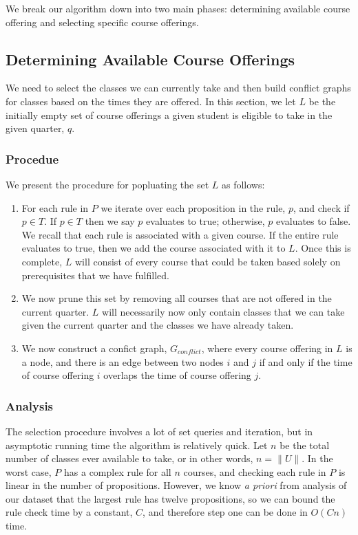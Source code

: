 \documentclass[11pt]{article} %
\begin{document}
We break our algorithm down into two main phases: determining available course offering and selecting specific course offerings.

\subsection{Determining Available Course Offerings}
We need to select the classes we can currently take and then build conflict graphs for classes based on the times they are offered. In this section, we let $L$ be the initially empty set of course offerings a given student is eligible to take in the given quarter, $q$. \\

\subsubsection{Procedue}
We present the procedure for popluating the set $L$ as follows:
\begin{enumerate}
\item For each rule in $P$ we iterate over each proposition in the rule, $p$, and check if $p \in T$. If $p \in T$ then we say $p$ evaluates to true; otherwise, $p$ evaluates to false. We recall that each rule is associated with a given course. If the entire rule evaluates to true, then we add the course associated with it to $L$. Once this is complete, $L$ will consist of every course that could be taken based solely on prerequisites that we have fulfilled.
\item We now prune this set by removing all courses that are not offered in the current quarter. $L$ will necessarily now only contain classes that we can take given the current quarter and the classes we have already taken.
\item We now construct a confict graph, $G_{conflict}$, where every course offering in $L$ is a node, and there is an edge between two nodes $i$ and $j$ if and only if the time of course offering $i$ overlaps the time of course offering $j$.
\end{enumerate}

\subsubsection{Analysis}
The selection procedure involves a lot of set queries and iteration, but in asymptotic running time the algorithm is relatively quick. Let $n$ be the total number of classes ever available to take, or in other words, $n = \|U\|$. In the worst case, $P$ has a complex rule for all $n$ courses, and checking each rule in $P$ is linear in the number of propositions. However, we know {\it a priori} from analysis of our dataset that the largest rule has twelve propositions, so we can bound the rule check time by a constant, $C$, and therefore step one can be done in $O(Cn)$ time.
\end{document}
